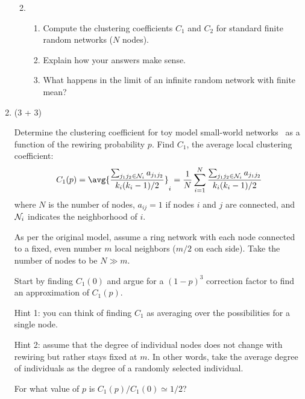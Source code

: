 \begin{enumerate}
\begin{enumerate}
    
   \solutionstart


   \solutionend


  \item
    \begin{enumerate}
    \item 
      Compute the clustering coefficients $C_{1}$ and $C_{2}$ for 
      standard finite random networks ($N$ nodes).  
    \item 
      Explain how your answers make sense.
    \item 
      What happens in the limit of an infinite random network
      with finite mean?
    \end{enumerate}

    
   \solutionstart


   \solutionend

  \end{enumerate}


\item (3 + 3)

  Determine the clustering coefficient for 
  toy model small-world networks~\cite{watts1998a}
  as a function of the rewiring probability $p$.
  Find $C_{1}$, the average local clustering coefficient:
  $$
  C_{1}(p) = \avg{\frac{\sum_{j_{1} j_{2} \in {\cal N}_{i}} a_{j_{1} j_{2}}}{k_{i}(k_{i}-1)/2}}_{i}
  =
  \frac{1}{N}
  \sum_{i=1}^{N}
  \frac{\sum_{j_{1} j_{2} \in {\cal N}_{i}} a_{j_{1} j_{2}}}{k_{i}(k_{i}-1)/2}
  $$
  where $N$ is the number of nodes,
  $a_{ij}=1$ if nodes $i$ and $j$ are connected,
  and ${\cal N}_{i}$ indicates the neighborhood of $i$.

  As per the original model, assume a ring network 
  with each node connected to a fixed, even number $m$ 
  local neighbors ($m/2$ on each side).  Take the number of nodes
  to be $N \gg m$.

  Start by finding $C_{1}(0)$ and argue
  for a $(1-p)^{3}$ correction factor to 
  find an approximation of $C_{1}(p)$.

  Hint 1: you can think of finding $C_{1}$ as
  averaging over the possibilities for a single node.

  Hint 2: assume that the degree of individual
  nodes does not change with rewiring 
  but rather stays fixed at $m$.
  In other words, take the average degree
  of individuals as the degree of a randomly
  selected individual.

  For what value of $p$ is $C_{1}(p)/C_{1}(0) \simeq 1/2$?


\end{enumerate}
